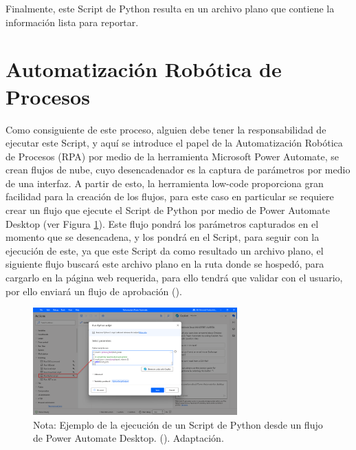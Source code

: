\documentclass[letter,oneside,12pt,spanish]{report}
\begin{document}
\noindent Finalmente, este Script de Python resulta en un archivo plano que contiene la información lista para reportar.


\section{Automatización Robótica de Procesos}

\noindent Como consiguiente de este proceso, alguien debe tener la responsabilidad de ejecutar este Script, y aquí se introduce el papel de la Automatización Robótica de Procesos (RPA) por medio de la herramienta Microsoft Power Automate, se crean flujos de nube, cuyo desencadenador es la captura de parámetros por medio de una interfaz. A partir de esto, la herramienta low-code proporciona gran facilidad para la creación de los flujos, para este caso en particular se requiere crear un flujo que ejecute el Script de Python por medio de Power Automate Desktop (ver Figura \ref{fig:runscript}). Este flujo pondrá los parámetros capturados en el momento que se desencadena, y los pondrá en el Script, para seguir con la ejecución de este, ya que este Script da como resultado un archivo plano, el siguiente flujo buscará este archivo plano en la ruta donde se hospedó, para cargarlo en la página web requerida, para ello tendrá que validar con el usuario, por ello enviará un flujo de aprobación (\cite{stackoverflow2024pythonpowerautomate}).


\begin{figure}[ht]
    \centering
    \includegraphics[width=0.7\textwidth]{Figs/ejecicion script - metodologia.png}
    \label{fig:runscript}
    \\Nota:  Ejemplo de la ejecución de un Script de Python desde un flujo de Power Automate Desktop. (\cite{stackoverflow2024pythonpowerautomate}). Adaptación.
\end{figure}
\end{document}
